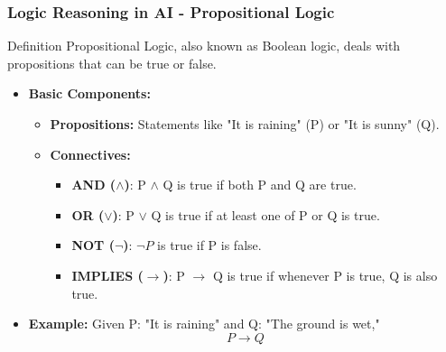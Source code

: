 \documentclass[aspectratio=169]{beamer}
\begin{document}
\begin{frame}[fragile]
  \frametitle{Logic Reasoning in AI - Propositional Logic}
  \begin{block}{Definition}
    Propositional Logic, also known as Boolean logic, deals with propositions that can be true or false.
  \end{block}
  
  \begin{itemize}
    \item \textbf{Basic Components:}
      \begin{itemize}
        \item \textbf{Propositions:} Statements like "It is raining" (P) or "It is sunny" (Q).
        \item \textbf{Connectives:} 
          \begin{itemize}
            \item \textbf{AND ($\land$)}: P $\land$ Q is true if both P and Q are true.
            \item \textbf{OR ($\lor$)}: P $\lor$ Q is true if at least one of P or Q is true.
            \item \textbf{NOT ($\neg$)}: $\neg P$ is true if P is false.
            \item \textbf{IMPLIES ($\rightarrow$)}: P $\rightarrow$ Q is true if whenever P is true, Q is also true.
          \end{itemize}
      \end{itemize}
    
    \item \textbf{Example:} Given P: "It is raining" and Q: "The ground is wet,"
    \[
      P \rightarrow Q
    \]
  \end{itemize}
\end{frame}
\end{document}

